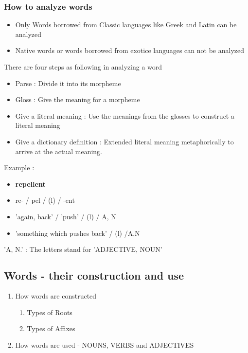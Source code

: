 \documentclass[12pt]{article}
\begin{document}
\subsubsection{How to analyze words}
\begin{itemize}
\item Only Words borrowed from Classic languages like Greek and Latin can be analyzed
\item Native words or words borrowed from exotice languages can not be analyzed
\end{itemize}
There are four steps as following in analyzing a word
\begin{itemize}
\item Parse : Divide it into its morpheme
\item Gloss : Give the meaning for a morpheme
\item Give a literal meaning :  Use the meanings from the glosses to construct a literal meaning
\item Give a dictionary definition : Extended literal meaning metaphorically to arrive at the actual meaning.
\end{itemize}

Example :
	\begin{addmargin}[3em]{2em}%
	\begin{itemize}
	\item \color{red} \textbf{repellent} \color{black} 
	\item re-  /  pel  /  (l)  /  -ent
	\item 'again, back' / 'push' / (l) / A, N
	\item 'something which pushes back' / (l) /A,N
	\end{itemize}
	\end{addmargin}
	
'A, N.' : The letters stand for 'ADJECTIVE, NOUN'

\subsection{Words - their construction and use}
\begin{enumerate}
\item How words are constructed
\begin{enumerate}
\item Types of Roots
\item Types of Affixes
\end{enumerate}
\item How words are used - NOUNS, VERBS and ADJECTIVES
\end{enumerate}
\end{document}
